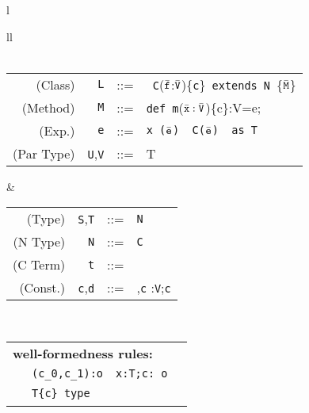 
\begin{figure*}
\footnotesize
\begin{tabular}{l}
\begin{tabular}{ll}
 \\
\quad\\
\begin{tabular}{r@{\quad}rcl}
(Class) & {\tt L} &{::=}& \klass\ {\tt C}($\bar{\tt f}$:$\bar{\tt V}$)\{{\tt c}\}\ {\tt extends}\ {\tt N}\ \{$\bar{\tt M}$\} \\
(Method)& {\tt M} &{::=}& {\tt def}\ {\tt m}($\bar{\tt x}:\bar{\tt V}$)\{c\}:V=e;\\
(Exp.)& {\tt e} &{::=}& \tt {\tt x} \alt \this \alt {\tt e.f} \alt {\tt e.m}($\bar{\tt e}$) 
\alt \new\ C($\bar{\tt e}$) \alt {\tt e}\ \mbox{as {\tt T}} \\ 
(Par Type) & {\tt U},{\tt V}&{::=} & T \\
\end{tabular} 
&
\begin{tabular}{r@{\quad}rcl}
(Type)& {\tt S},{\tt T}&{::=}& {\tt N} \alt {\tt T\{c\}}\\
(N Type) & {\tt N}&{::=}& {\tt C} \alt {\tt N\{c\}}\\
(C Term) & {\tt t} &{::=}& \self\\
(Const.) & {\tt c},{\tt d} &{::=}&\true \alt {\tt c},{\tt c} \alt {\tt x}:{\tt V};{\tt c}\\
\end{tabular} 
\end{tabular}
\quad \\
{\tabcolsep=0pt
\begin{tabular}{p{}p{}p{}p{}}
\multicolumn{4}{l}{\bf \FX{} well-formedness rules:}\\
\infax[{\tt true}]{\Gamma \vdash {\tt true}: {\tt o}}
&
\infrule[And]
{\tt \Gamma \vdash c_0: o \andalso \Gamma \vdash c_1: o}
{\tt \Gamma \vdash (c_0,c_1):o}
&
\infrule[Exists]
{\tt \Gamma \vdash t: T \andalso \Gamma \vdash c[t/x]:o}
{\tt \Gamma \vdash x:T;c: o}
&
\\
\infrule[Class]
{\Gamma \vdash \klass({\tt C})}
{\Gamma \vdash {\tt C}\ \type} 
&
\infrule[Dep]
{\tt \Gamma \vdash T\ \type \andalso \Gamma, \self:T \vdash c:o}
{\tt \Gamma \vdash T\{c\}\ {\tt type}} 
&& \\
\end{tabular}}\\
\quad\\
{\tabcolsep=0pt
}
\end{tabular}
\end{figure*}
